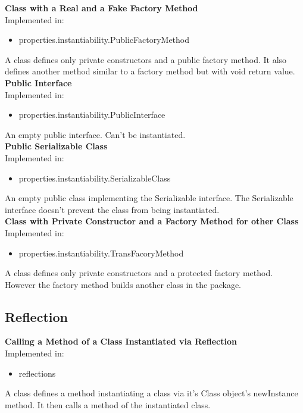 \documentclass{article}
\begin{document}
\noindent
\textbf{Class with a Real and a Fake Factory Method}\\
Implemented in: 
\begin{itemize}
    \item properties.instantiability.PublicFactoryMethod
\end{itemize}
A class defines only private constructors and a public factory method. It also defines another method similar to a factory method but with void return value.\\

\noindent
\textbf{Public Interface}\\
Implemented in: 
\begin{itemize}
    \item properties.instantiability.PublicInterface
\end{itemize}
An empty public interface. Can't be instantiated.\\

\noindent
\textbf{Public Serializable Class}\\
Implemented in: 
\begin{itemize}
    \item properties.instantiability.SerializableClass
\end{itemize}
An empty public class implementing the Serializable interface. The Serializable interface doesn't prevent the class from being instantiated.\\

\noindent
\textbf{Class with Private Constructor and a Factory Method for other Class}\\
Implemented in: 
\begin{itemize}
    \item properties.instantiability.TransFacoryMethod
\end{itemize}
A class defines only private constructors and a protected factory method. However the factory method builds another class in the package.\\

\subsection{Reflection}

\textbf{Calling a Method of a Class Instantiated via Reflection}\\
Implemented in: 
\begin{itemize}
    \item reflections
\end{itemize}
A class defines a method instantiating a class via it's Class object's newInstance method. It then calls a method of the instantiated class.\\
\end{document}
